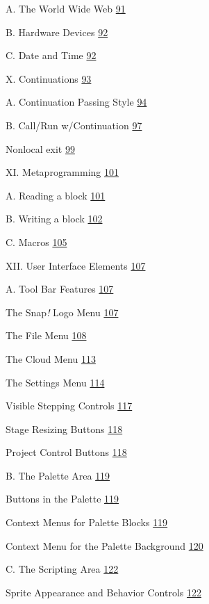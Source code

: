 A. The World Wide Web \hyperref[the-world-wide-web]{91}

B. Hardware Devices \hyperref[hardware-devices]{92}

C. Date and Time \hyperref[date-and-time]{92}

X. Continuations \hyperref[continuations]{93}

A. Continuation Passing Style \hyperref[continuation-passing-style]{94}

B. Call/Run w/Continuation \hyperref[callrun-wcontinuation]{97}

Nonlocal exit \hyperref[nonlocal-exit]{99}

XI. Metaprogramming \hyperref[metaprogramming]{101}

A. Reading a block \hyperref[reading-a-block]{101}

B. Writing a block \hyperref[writing-a-block]{102}

C. Macros \hyperref[macros]{105}

XII. User Interface Elements \hyperref[user-interface-elements]{107}

A. Tool Bar Features \hyperref[tool-bar-features]{107}

The Snap\emph{!} Logo Menu \hyperref[the-snap-logo-menu]{107}

The File Menu \hyperref[the-file-menu]{108}

The Cloud Menu \hyperref[the-cloud-menu]{113}

The Settings Menu \hyperref[the-settings-menu]{114}

Visible Stepping Controls \hyperref[visible-stepping-controls]{117}

Stage Resizing Buttons \hyperref[stage-resizing-buttons]{118}

Project Control Buttons \hyperref[project-control-buttons]{118}

B. The Palette Area \hyperref[the-palette-area]{119}

Buttons in the Palette \hyperref[buttons-in-the-palette]{119}

Context Menus for Palette Blocks
\hyperref[context-menus-for-palette-blocks]{119}

Context Menu for the Palette Background
\hyperref[context-menu-for-the-palette-background]{120}

C. The Scripting Area \hyperref[the-scripting-area]{122}

Sprite Appearance and Behavior Controls
\hyperref[sprite-appearance-and-behavior-controls]{122}

